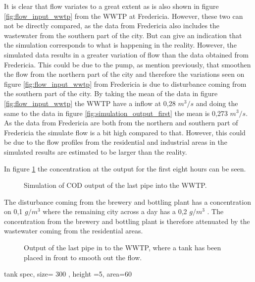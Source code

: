 It is clear that flow variates to a great extent as is also shown in figure \ref{fig:flow_input_wwtp} from the WWTP at Fredericia. However, these two can not be directly compared, as the data from Fredericia also includes the wastewater from the southern part of the city. But can give an indication that the simulation corresponds to what is happening in the reality. However, the simulated data results in a greater variation of flow than the data obtained from Fredericia. This could be due to the pump, as mention previously, that smoothen the flow from the northern part of the city and therefore the variations seen on figure \ref{fig:flow_input_wwtp} from Fredericia is due to disturbance coming from the southern part of the city. By taking the mean of the data in figure \ref{fig:flow_input_wwtp} the WWTP have a inflow at 0,28 $m^3/s$ and doing the same to the data in figure \ref{fig:simulation_output_first} the mean is 0,273 $m^3/s$. As the data from Fredericia are both from the northern and southern part of Fredericia the simulate flow is a bit high compared to that. However, this could be due to the flow profiles from the residential and industrial areas in the simulated results are estimated to be larger than the reality.     

In figure \ref{fig:simulation_output_first_concentration} the concentration at the output for the first eight hours can be seen.

\begin{figure}[H]
\centering

\caption{Simulation of COD output of the last pipe into the WWTP.}
\label{fig:simulation_output_first_concentration}
\end{figure}  

The disturbance coming from the brewery and bottling plant has a concentration on 0,1 $g/m^3$ where the remaining city across a day has a 0,2 $g/m^3$ . The concentration from the brewery and bottling plant is therefore attenuated by the wastewater coming from the residential areas. 



\begin{figure}[H]
\centering

\caption{Output of the last pipe in to the WWTP, where a tank has been placed in front to smooth out the flow.}
\label{fig:simulation_output_second}
\end{figure} 

tank spec, size=  300 , height =5,	area=60
			   